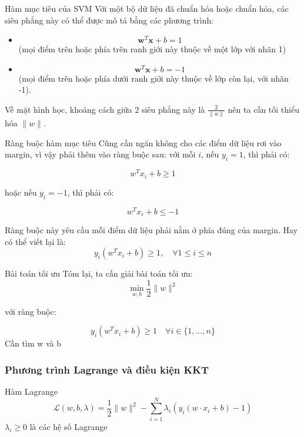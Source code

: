 \documentclass[serif, aspectratio=169]{beamer}
\begin{document}
	\begin{frame}{Hàm mục tiêu của SVM}
		Với một bộ dữ liệu đã chuẩn hóa hoặc chuẩn hóa, các siêu phẳng này có thể được mô tả bằng các phương trình:
		\begin{itemize}
			\item \[
			\mathbf{w}^T \mathbf{x} + b = 1
			\]
			(mọi điểm trên hoặc phía trên ranh giới này thuộc về một lớp với nhãn 1)
			\item \[
			\mathbf{w}^T \mathbf{x} + b = -1
			\]
			(mọi điểm trên hoặc phía dưới ranh giới này thuộc về lớp còn lại, với nhãn -1).
		\end{itemize}
		Về mặt hình học, khoảng cách giữa 2 siêu phẳng này là \(\frac{2}{\| w \|}\) nên ta cần tối thiểu hóa \(\| w \|\). 
		
	\end{frame}
	
	\begin{frame}{Ràng buộc hàm mục tiêu}
		Cũng cần ngăn không cho các điểm dữ liệu rơi vào margin, vì vậy phải thêm vào ràng buộc sau: với mỗi \(i\), nếu \(y_i = 1\), thì phải có:
		
		\[
		w^T x_i + b \geq 1
		\]
		
		hoặc nếu \(y_i = -1\), thì phải có:
		
		\[
		w^T x_i + b \leq -1
		\]
		
		Ràng buộc này yêu cầu mỗi điểm dữ liệu phải nằm ở phía đúng của margin. Hay có thể viết lại là: \[
		y_i (w^T x_i + b) \geq 1, \quad \forall 1 \leq i \leq n
		\]
		
	\end{frame}
	
	\begin{frame}{Bài toán tối ưu}
		Tóm lại, ta cần giải bài toán tối ưu: \[
		\min_{w, b} \frac{1}{2} \| w \|^2
		\]
		
		với ràng buộc:
		
		\[
		y_i (w^T x_i + b) \geq 1 \quad \forall i \in \{1, \dots, n\}
		\]
		Cần tìm w và b
	\end{frame}
	\subsubsection{Phương trình Lagrange và điều kiện KKT}
	\begin{frame}{Hàm Lagrange}
		\[
		\mathcal{L}(w, b, \lambda) = \frac{1}{2} \| w \|^2 - \sum_{i=1}^{N} \lambda_i \left( y_i (w \cdot x_i + b) - 1 \right)
		\]
		\( \lambda_i \geq 0 \) là các hệ số Lagrange
	\end{frame}
	
\end{document}
